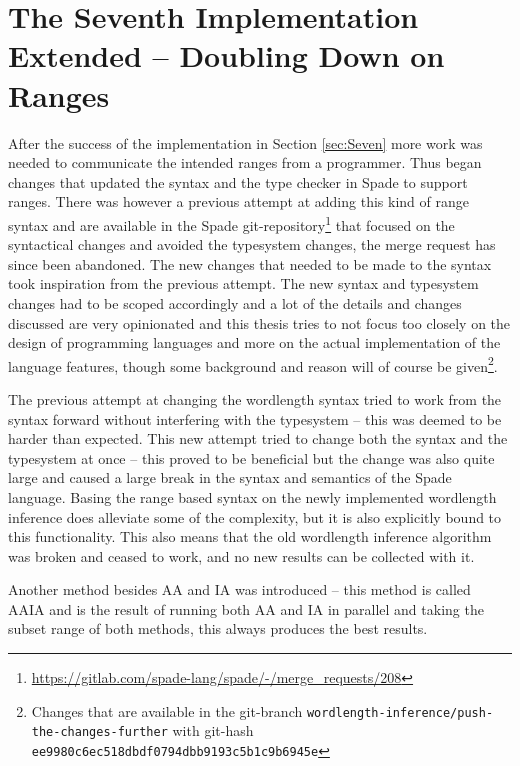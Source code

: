 \section{The Seventh Implementation Extended -- Doubling Down on Ranges}
\label{sec:Seven2}
After the success of the implementation in Section \ref{sec:Seven} more work was needed to communicate the intended ranges from a programmer. Thus began changes that updated the syntax and the type checker in Spade to support ranges. There was however a previous attempt at adding this kind of range syntax and are available in the Spade git-repository\cprotect\footnote{\url{https://gitlab.com/spade-lang/spade/-/merge_requests/208}} that focused on the syntactical changes and avoided the typesystem changes, the merge request has since been abandoned. The new changes that needed to be made to the syntax took inspiration from the previous attempt.
The new syntax and typesystem changes had to be scoped accordingly and a lot of the details and changes discussed are very opinionated and this thesis tries to not focus too closely on the design of programming languages and more on the actual implementation of the language features, though some background and reason will of course be given\cprotect\footnote{Changes that are available in the git-branch \verb+wordlength-inference/push-the-changes-further+ with git-hash \verb+ee9980c6ec518dbdf0794dbb9193c5b1c9b6945e+}.

The previous attempt at changing the wordlength syntax tried to work from the syntax forward without interfering with the typesystem -- this was deemed to be harder than expected. This new attempt tried to change both the syntax and the typesystem at once -- this proved to be beneficial but the change was also quite large and caused a large break in the syntax and semantics of the Spade language. Basing the range based syntax on the newly implemented wordlength inference does alleviate some of the complexity, but it is also explicitly bound to this functionality. This also means that the old wordlength inference algorithm was broken and ceased to work, and no new results can be collected with it.

Another method besides AA and IA was introduced -- this method is called AAIA and is the result of running both AA and IA in parallel and taking the subset range of both methods, this always produces the best results.


